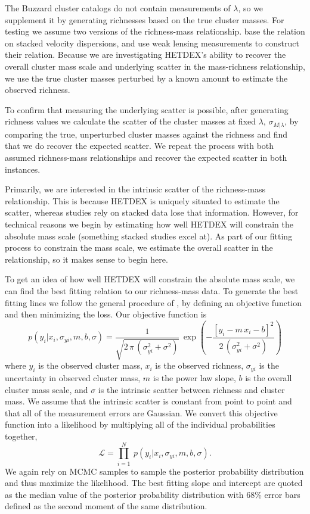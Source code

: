 \documentclass[fleqn,usenatbib]{mnras}
\begin{document}
The Buzzard cluster catalogs do not contain measurements of $\lambda$, so we supplement it by generating richnesses based on the true cluster masses. For testing we assume two versions of the richness-mass relationship. \cite{Farahi2016} base the relation on stacked velocity dispersions, and \cite{Simet2016} use weak lensing measurements to construct their relation. Because we are investigating HETDEX's ability to recover the overall cluster mass scale and underlying scatter in the mass-richness relationship, we use the true cluster masses perturbed by a known amount to estimate the observed richness. 

To confirm that measuring the underlying scatter is possible, after generating richness values we calculate the scatter of the cluster masses at fixed $\lambda$, $\sigma_{M|\lambda}$, by comparing the true, unperturbed cluster masses against the richness and find that we do recover the expected scatter. We repeat the process with both assumed richness-mass relationships and recover the expected scatter in both instances. 

Primarily, we are interested in the intrinsic scatter of the richness-mass relationship. This is because HETDEX is uniquely situated to estimate the scatter, whereas studies rely on stacked data  lose that information. However, for technical reasons we begin by estimating how well HETDEX will constrain the absolute mass scale (something stacked studies excel at). As part of our fitting process to constrain the mass scale, we estimate the overall scatter in the relationship, so it makes sense to begin here.

To get an idea of how well HETDEX will constrain the absolute mass scale, we can find the best fitting relation to our richness-mass data. To generate the best fitting lines we follow the general procedure of \cite{Hogg2010}, by defining an objective function and then minimizing the loss. Our objective function is
\begin{equation}\label{eq:objectivei}
p(y_i|x_i,\sigma_{yi},m,b,\sigma) = \frac{1}{\sqrt{2\,\pi\,(\sigma_{yi}^2+\sigma^2)}}
 \,\exp\left(-\frac{[y_i - m\,x_i - b]^2}{2\,(\sigma_{yi}^2+\sigma^2)}\right)
\end{equation}
where $y_i$ is the observed cluster mass, $x_i$ is the observed richness, $\sigma_{yi}$ is the uncertainty in observed cluster mass, $m$ is the power law slope, $b$ is the overall cluster mass scale, and $\sigma$ is the intrinsic scatter between richness and cluster mass. We assume that the intrinsic scatter is constant from point to point and that all of the measurement errors are Gaussian. We convert this objective function into a likelihood by multiplying all of the individual probabilities together,  
\begin{equation}\label{eq:like}
\mathscr{L} = \prod_{i=1}^N \ p(y_i|x_i,\sigma_{yi},m,b, \sigma).
\end{equation}
We again rely on MCMC samples to sample the posterior probability distribution and thus maximize the likelihood. The best fitting slope and intercept are quoted as the median value of the posterior probability distribution with 68\% error bars defined as the second moment of the same distribution.
\end{document}
